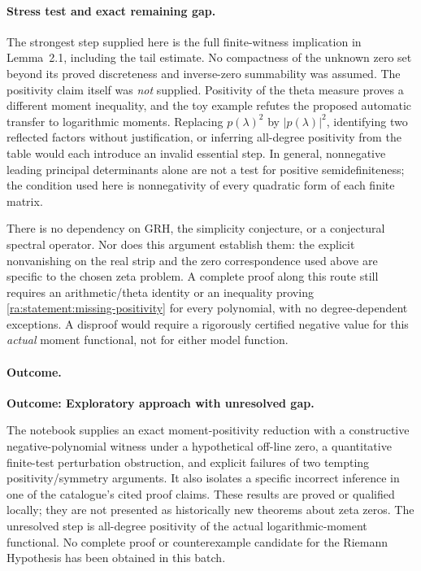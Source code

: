 \documentclass[11pt]{article}
\begin{document}
\paragraph{Stress test and exact remaining gap.}
The strongest step supplied here is the full finite-witness implication in
Lemma~2.1, including the tail estimate. No compactness of the unknown zero
set beyond its proved discreteness and inverse-zero summability was assumed.
The positivity claim itself was \emph{not} supplied. Positivity of the theta
measure proves a different moment inequality, and the toy example refutes
the proposed automatic transfer to logarithmic moments. Replacing
$p(\lambda)^2$ by $|p(\lambda)|^2$, identifying two reflected factors without
justification, or inferring all-degree positivity from the table would each
introduce an invalid essential step. In general, nonnegative leading
principal determinants alone are not a test for positive semidefiniteness;
the condition used here is nonnegativity of every quadratic form of each
finite matrix.

There is no dependency on GRH, the simplicity conjecture, or a conjectural
spectral operator. Nor does this argument establish them: the explicit
nonvanishing on the real strip and the zero correspondence used above are
specific to the chosen zeta problem. A complete proof along this route still
requires an arithmetic/theta identity or an inequality proving
\eqref{ra:statement:missing-positivity} for every polynomial, with no degree-dependent
exceptions. A disproof would require a rigorously certified negative value
for this \emph{actual} moment functional, not for either model function.

\paragraph{Outcome.}
\textbf{Outcome: Exploratory approach with unresolved gap.}

The notebook supplies an exact moment-positivity reduction with a constructive
negative-polynomial witness under a hypothetical off-line zero, a quantitative
finite-test perturbation obstruction, and explicit failures of two tempting
positivity/symmetry arguments. It also isolates a specific incorrect inference
in one of the catalogue's cited proof claims. These results are proved or
qualified locally; they are not presented as historically new theorems about
zeta zeros. The unresolved step is all-degree positivity of the actual
logarithmic-moment functional. No complete proof or counterexample candidate
for the Riemann Hypothesis has been obtained in this batch.
\end{document}
